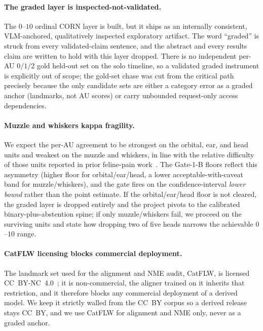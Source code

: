 \paragraph{The graded layer is inspected-not-validated.}
The $0$--$10$ ordinal CORN layer is built, but it ships as an internally
consistent, VLM-anchored, qualitatively inspected exploratory artifact. The word
``graded'' is struck from every validated-claim sentence, and the abstract and
every results claim are written to hold with this layer dropped. There is no
independent per-AU $0/1/2$ gold held-out set on the solo timeline, so a validated
graded instrument is explicitly out of scope; the gold-set chase was cut from
the critical path precisely because the only candidate sets are either a category
error as a graded anchor (landmarks, not AU scores) or carry unbounded
request-only access dependencies.

\paragraph{Muzzle and whiskers kappa fragility.}
We expect the per-AU agreement to be strongest on the orbital, ear, and head
units and weakest on the muzzle and whiskers, in line with the relative
difficulty of those units reported in prior feline-pain
work~\cite{feighelstein2023}. The Gate-1-B floors reflect this asymmetry
(higher floor for orbital/ear/head, a lower acceptable-with-caveat band for
muzzle/whiskers), and the gate fires on the confidence-interval \emph{lower
bound} rather than the point estimate. If the orbital/ear/head floor is not
cleared, the graded layer is dropped entirely and the project pivots to the
calibrated binary-plus-abstention spine; if only muzzle/whiskers fail, we
proceed on the surviving units and state how dropping two of five heads narrows
the achievable $0$--$10$ range.

\paragraph{CatFLW licensing blocks commercial deployment.}
The landmark set used for the alignment and NME audit, CatFLW, is licensed
CC~BY-NC~4.0~\cite{martvel2024catflw}; it is non-commercial, the aligner trained
on it inherits that restriction, and it therefore blocks any commercial
deployment of a derived model. We keep it strictly walled from the CC~BY corpus
so a derived release stays CC~BY, and we use CatFLW for alignment and NME only,
never as a graded anchor.

